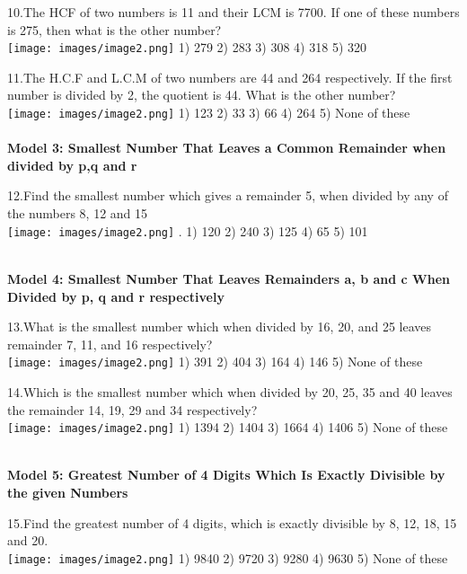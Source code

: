 \documentclass[
]{article}
\begin{document}
10.The HCF of two numbers is 11 and their LCM is 7700. If one of these numbers is 275, then what is the other number?\\
\texttt{[image: images/image2.png]} 1) 279 	2) 283 	3) 308 	4) 318 	5) 320

11.The H.C.F and L.C.M of two numbers are 44 and 264 respectively. If the first number is divided by 2, the quotient is 44. What is the other number?\\
\texttt{[image: images/image2.png]} 1) 123 	2) 33 	3) 66 	4) 264 	5) None of these \\

\textbf{\\ Model 3: Smallest Number That Leaves a Common Remainder when divided by p,q and r \\}

12.Find the smallest number which gives a remainder 5, when divided by any of the numbers 8, 12 and 15\\
\texttt{[image: images/image2.png]} . 1) 120 	2) 240 	3) 125 	4) 65 	5) 101

\textbf{\\ Model 4: Smallest Number That Leaves Remainders a, b and c When Divided by p, q and r respectively \\}

13.What is the smallest number which when divided by 16, 20, and 25 leaves remainder 7, 11, and 16 respectively?\\
\texttt{[image: images/image2.png]} 1) 391 	2) 404 3) 164 4) 146 5) None of these


14.Which is the smallest number which when divided by 20, 25, 35 and 40 leaves the remainder 14, 19, 29 and 34 respectively?\\
\texttt{[image: images/image2.png]} 1) 1394 	2) 1404 	3) 1664 	4) 1406 	5) None of these

\textbf{\\ Model 5: Greatest Number of 4 Digits Which Is Exactly Divisible by the given Numbers \\}

15.Find the greatest number of 4 digits, which is exactly divisible by 8, 12, 18, 15 and 20.\\
\texttt{[image: images/image2.png]} 1) 9840 	2) 9720 	3) 9280 	4) 9630 	5) None of these
\end{document}
